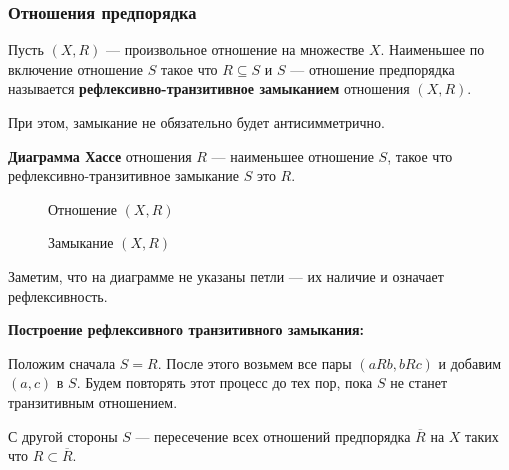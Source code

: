 \documentclass{article}
\begin{document}
    \subsubsection{Отношения предпорядка}
    \begin{definition}
        Пусть \((X, R)\) --- произвольное отношение на множестве \(X\). Наименьшее по включение отношение \(S\) такое что \(R \subseteq S\) и \(S\) --- отношение предпорядка называется \textbf{рефлексивно-транзитивное замыканием} отношения \((X, R)\). 
    \end{definition}
    \begin{remark}
    При этом, замыкание не обязательно будет антисимметрично.
    \end{remark}
        \begin{definition}
        \textbf{Диаграмма Хассе} отношения \(R\) --- наименьшее отношение \(S\), такое что рефлексивно-транзитивное замыкание \(S\) это \(R\).
    \end{definition}
    
    \begin{figure}[h!]
        \centering
        \caption{Отношение \((X, R)\)}
        \label{fig:hasse}
    \end{figure}
    
    \begin{figure}[h!]
        \label{fig:hasse_full}
        \centering
        \caption{Замыкание \((X, R)\)}
    \end{figure}
    
    \begin{remark}
        Заметим, что на диаграмме не указаны петли --- их наличие и означает рефлексивность. 
    \end{remark}
    
    \textbf{Построение рефлексивного транзитивного замыкания:} 
    
    Положим сначала \(S = R\). После этого возьмем все пары \((aRb, bRc)\) и добавим \((a, c)\) в \(S\). Будем повторять этот процесс до тех пор, пока \(S\) не станет транзитивным отношением. 
    
    С другой стороны \(S\) --- пересечение всех отношений предпорядка \(\overline{R}\) на \(X\) таких что \(R \subset \overline{R}\).
\end{document}
